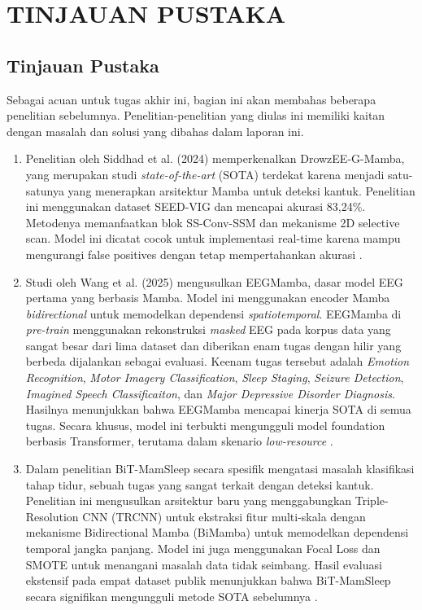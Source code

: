\newpage
\chapter{TINJAUAN PUSTAKA} \label{Bab II}

\section{Tinjauan Pustaka} \label{II.Tinjauan}
Sebagai acuan untuk tugas akhir ini, bagian ini akan membahas beberapa penelitian sebelumnya. Penelitian-penelitian yang diulas ini memiliki kaitan dengan masalah dan solusi yang dibahas dalam laporan ini.

\begin{enumerate}[noitemsep]
	\item Penelitian oleh Siddhad et al. (2024) memperkenalkan DrowzEE-G-Mamba, yang merupakan studi \textit{state-of-the-art} (SOTA) terdekat karena menjadi satu-satunya yang menerapkan arsitektur Mamba untuk deteksi kantuk. Penelitian ini menggunakan dataset SEED-VIG dan mencapai akurasi 83,24\%. Metodenya memanfaatkan blok SS-Conv-SSM dan mekanisme 2D selective scan. Model ini dicatat cocok untuk implementasi real-time karena mampu mengurangi false positives dengan tetap mempertahankan akurasi \cite{Siddhad2024}.

	\item Studi oleh Wang et al. (2025) mengusulkan EEGMamba, dasar model EEG pertama yang berbasis Mamba. Model ini menggunakan encoder Mamba \textit{bidirectional} untuk memodelkan dependensi \textit{spatiotemporal}. EEGMamba di \textit{pre-train} menggunakan rekonstruksi \textit{masked} EEG pada korpus data yang sangat besar dari lima dataset dan diberikan enam tugas dengan hilir yang berbeda dijalankan sebagai evaluasi. Keenam tugas tersebut adalah \textit{Emotion Recognition}, \textit{Motor Imagery Classification}, \textit{Sleep Staging}, \textit{Seizure Detection}, \textit{Imagined Speech Classificaiton}, dan \textit{Major Depressive Disorder Diagnosis}. Hasilnya menunjukkan bahwa EEGMamba mencapai kinerja SOTA di semua tugas. Secara khusus, model ini terbukti mengungguli model foundation berbasis Transformer, terutama dalam skenario \textit{low-resource} \cite{Zhou2025}.

	\item Dalam penelitian BiT-MamSleep secara spesifik mengatasi masalah klasifikasi tahap tidur, sebuah tugas yang sangat terkait dengan deteksi kantuk. Penelitian ini mengusulkan arsitektur baru yang menggabungkan Triple-Resolution CNN (TRCNN) untuk ekstraksi fitur multi-skala dengan mekanisme Bidirectional Mamba (BiMamba) untuk memodelkan dependensi temporal jangka panjang. Model ini juga menggunakan Focal Loss dan SMOTE untuk menangani masalah data tidak seimbang. Hasil evaluasi ekstensif pada empat dataset publik menunjukkan bahwa BiT-MamSleep secara signifikan mengungguli metode SOTA sebelumnya \cite{Zhou2024Sleep}.


\end{enumerate}
